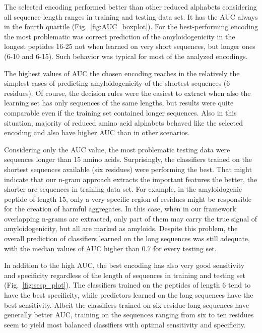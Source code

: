\documentclass{bioinfo}
\begin{document}
The selected encoding performed better than other reduced alphabets 
considering all sequence length ranges in training and testing data set. It has 
the AUC always in the fourth quartile (Fig.~\ref{fig:AUC_boxplot}). For the 
best-performing encoding the most problematic was correct prediction of the 
amyloidogenicity in the longest peptides 16-25 not when learned on very short 
sequences, but longer ones (6-10 and 6-15). Such behavior was typical for most 
of the analyzed encodings.

  The highest values of AUC the chosen encoding reaches in the relatively the 
simplest cases of predicting amyloidogenicity of the shortest sequences (6 
residues). Of course, the decision rules were the easiest to extract when also 
the learning set has only sequences of the same lengths, but results were quite 
comparable even if the training set contained longer sequences. Also in this 
situation, majority of reduced amino acid alphabets behaved like the selected 
encoding and also have higher AUC than in other scenarios.

  Considering only the AUC value, the most problematic testing data were 
sequences longer than 15 amino acids. Surprisingly, the classifiers trained on 
the shortest sequences available (six residues) were performing the best. That 
might indicate that our n-gram approach extracts the important features the 
better, the shorter are sequences in training data set. For example, in the 
amyloidogenic peptide of length 15, only a very specific region of residues 
might be responsible for the creation of harmful aggregates. In this case, when 
in our framework overlapping n-grams are extracted, only part of them may carry 
the true signal of amyloidogenicity, but all are marked as amyloids. 
Despite this problem, the overall prediction of classifiers learned on the long 
sequences was still adequate, with the median values of AUC higher than 0.7 for 
every testing set. 

  In addition to the high AUC, the best encoding has also very good sensitivity 
and specificity regardless of the length of sequences in training and testing 
set (Fig.~\ref{fig:sesp_plot}). The classifiers trained on the peptides of 
length 6 tend to have the best specificity, while predictors learned on the long 
sequences have the best sensitivity. Albeit the classifiers trained on 
six-residue-long sequences have generally better AUC, training on 
the sequences ranging from six to ten residues seem to yield most balanced 
classifiers with optimal sensitivity and specificity.
\end{document}
